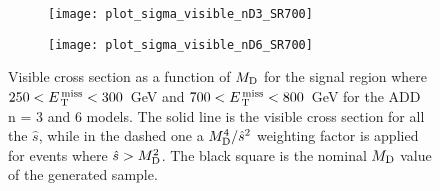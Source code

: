 \begin{figure}[!h]
  \centering
  \begin{subfigure}{.48\linewidth}
    \texttt{[image: plot\_sigma\_visible\_nD3\_SR700]}
    \caption{}
    \label{fig:sigma_vis_n3}
  \end{subfigure}
  \begin{subfigure}{.48\linewidth}
    \texttt{[image: plot\_sigma\_visible\_nD6\_SR700]}
    \caption{}
    \label{fig:sigma_vis_n6}
  \end{subfigure}
  \caption{Visible cross section as a function of $M_\mathrm{D}$ for the signal region
    where $250 < E_\mathrm{\, T}^\mathrm{\, miss} < 300$~GeV and $700 < E_\mathrm{\, T}^\mathrm{\, miss} < 800$~GeV for the ADD n = 3
    and 6 models. The solid line is the visible cross section for all the
    $\hat{s}$, while in the dashed one a $M_\mathrm{D}^4/\hat{s}^2$ weighting factor is
    applied for events where $\hat{s} > M_\mathrm{D}^2$. The black square is the nominal
    $M_\mathrm{D}$ value of the generated sample.}
  \label{fig:vis_sigma_trunc}
\end{figure}
